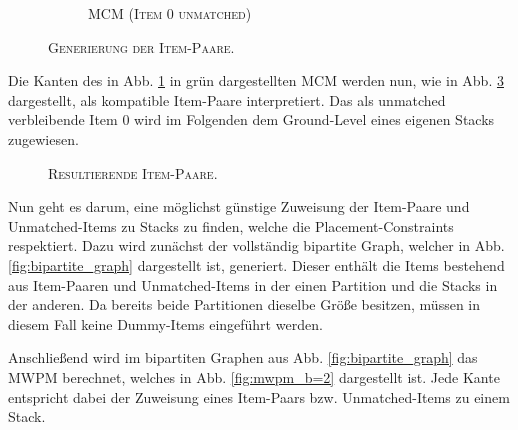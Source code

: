 \begin{figure}[H]
\begin{subfigure}[b]{0.4\textwidth}
    \caption{\textsc{MCM (Item $0$ unmatched)}}
    \label{fig:stacking_const_graph_example_b=2_b}
    \end{subfigure}
\caption{\textsc{Generierung der Item-Paare}.}
\label{fig:stacking_const_graph_example_b=2}
\end{figure}
Die Kanten des in Abb. \ref{fig:stacking_const_graph_example_b=2_b} in grün dargestellten \textsc{MCM} werden nun,
wie in Abb. \ref{fig:item_pairs_b=2} dargestellt, als kompatible Item-Paare interpretiert. Das als unmatched verbleibende
Item $0$ wird im Folgenden dem Ground-Level eines eigenen Stacks zugewiesen.
\begin{figure}[H]
\centering
{}
  \caption{\textsc{Resultierende Item-Paare.}}
  \label{fig:item_pairs_b=2}
\end{figure}

Nun geht es darum, eine möglichst günstige Zuweisung der Item-Paare und Unmatched-Items zu Stacks zu finden,
welche die Placement-Constraints respektiert. Dazu wird zunächst der vollständig bipartite Graph, welcher in
Abb. \ref{fig:bipartite_graph} dargestellt ist, generiert. Dieser enthält die Items bestehend aus Item-Paaren
und Unmatched-Items in der einen Partition und die Stacks in der anderen. Da bereits beide Partitionen
dieselbe Größe besitzen, müssen in diesem Fall keine Dummy-Items eingeführt werden.

Anschließend wird im bipartiten Graphen aus Abb. \ref{fig:bipartite_graph} das \textsc{MWPM} berechnet,
welches in Abb. \ref{fig:mwpm_b=2} dargestellt ist. Jede Kante entspricht dabei der Zuweisung eines Item-Paars bzw. Unmatched-Items
zu einem Stack.

